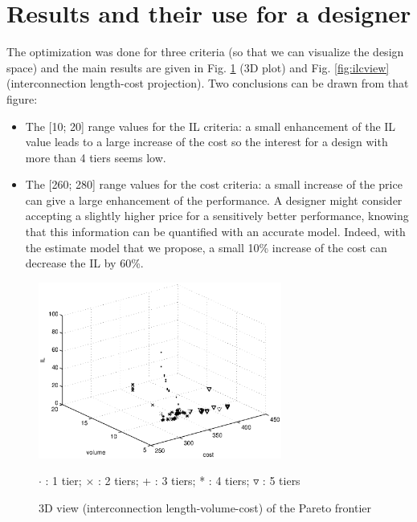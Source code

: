 \section{Results and their use for a designer}
The optimization was done for three criteria (so that we can visualize the design space) and the main results are given in Fig. \ref{fig:ds3dview} (3D plot) and Fig. \ref{fig:ilcview} (interconnection length-cost projection). Two conclusions can be drawn from that figure:
\begin{itemize}
\item The [10; 20] range values for the IL criteria: a small enhancement of the IL value leads to a large increase of the cost so the interest for a design with more than 4 tiers seems low.
\item The [260; 280] range values for the cost criteria: a small increase of the price can give a large enhancement of the performance. A designer might consider accepting a slightly higher price for a sensitively better performance, knowing that this information can be quantified with an accurate model. Indeed, with the estimate model that we propose, a small 10\% increase of the cost can decrease the IL by 60\%.
\end{itemize}

\begin{figure}[h!]
\begin{center}
\includegraphics[width=8cm]{ultiplot.eps}
\end{center}
\vspace{-0.5cm}
\caption{3D view (interconnection length-volume-cost) of the Pareto frontier}
\begin{center}
\begin{scriptsize}
$\cdot$ : 1 tier; $\times$ : 2 tiers; + : 3 tiers; * : 4 tiers; $\triangledown$ : 5 tiers
\end{scriptsize}
\end{center}
\label{fig:ds3dview}
\end{figure}

